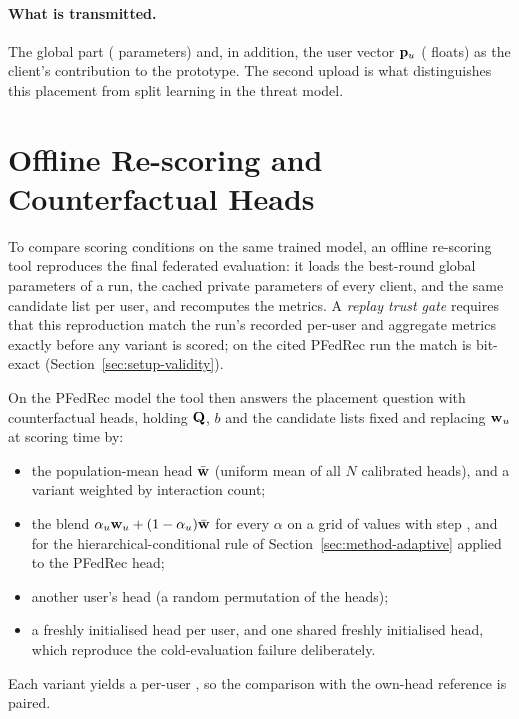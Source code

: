 \paragraph{What is transmitted.} The global part (\ParamsSplitGlobal{} parameters) and, in
addition, the user vector $\mathbf{p}_u$ (\ParamsAdaptiveUploadExtra{} floats) as the client's
contribution to the prototype. The second upload is what distinguishes this placement from
split learning in the threat model.

\section{Offline Re-scoring and Counterfactual Heads}
\label{sec:method-reeval}

To compare scoring conditions on the same trained model, an offline re-scoring tool reproduces
the final federated evaluation: it loads the best-round global parameters of a run, the cached
private parameters of every client, and the same candidate list per user, and recomputes the
metrics. A \emph{replay trust gate} requires that this reproduction match the run's recorded
per-user and aggregate metrics exactly before any variant is scored; on the cited PFedRec run the
match is bit-exact (Section~\ref{sec:setup-validity}).

On the PFedRec model the tool then answers the placement question with counterfactual heads,
holding $\mathbf{Q}$, $b$ and the candidate lists fixed and replacing $\mathbf{w}_u$ at scoring time by:
\begin{itemize}[leftmargin=2em]
  \item the population-mean head $\bar{\mathbf{w}}$ (uniform mean of all $N$ calibrated heads),
        and a variant weighted by interaction count;
  \item the blend $\alpha_u \mathbf{w}_u + (1-\alpha_u)\bar{\mathbf{w}}$ for every $\alpha$ on a grid of
        \HeadAlphaGridSize{} values with step \HeadAlphaGridStep, and for the
        hierarchical-conditional rule of Section~\ref{sec:method-adaptive} applied to the
        PFedRec head;
  \item another user's head (a random permutation of the heads);
  \item a freshly initialised head per user, and one shared freshly initialised head, which
        reproduce the cold-evaluation failure deliberately.
\end{itemize}
Each variant yields a per-user \ndcg{}, so the comparison with the own-head reference is paired.

